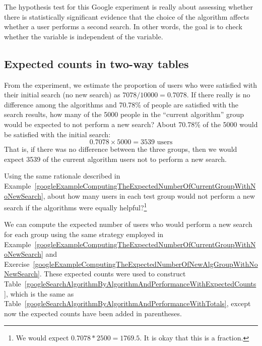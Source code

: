 The hypothesis test for this Google experiment is really about assessing whether there is statistically significant evidence that the choice of the algorithm affects whether a user performs a second search. In other words, the goal is to check whether the  variable is independent of the  variable.


\subsection{Expected counts in two-way tables}

\begin{example}{From the experiment, we estimate the proportion of users who were satisfied with their initial search (no new search) as $7078/10000 = 0.7078$. If there really is no difference among the algorithms and 70.78\% of people are satisfied with the search results, how many of the 5000 people in the ``current algorithm'' group would be expected to not perform a new search?} \label{googleExampleComputingTheExpectedNumberOfCurrentGroupWithNoNewSearch}
About 70.78\% of the 5000 would be satisfied with the initial search:
$$ 0.7078\times 5000 = 3539\text{ users} $$
That is, if there was no difference between the three groups, then we would expect 3539 of the current algorithm users not to perform a new search.
\end{example}

\begin{exercise}\label{googleExampleComputingTheExpectedNumberOfNewAlgGroupWithNoNewSearch}
Using the same rationale described in Example~\ref{googleExampleComputingTheExpectedNumberOfCurrentGroupWithNoNewSearch}, about how many users in each test group would not perform a new search if the algorithms were equally helpful?\footnote{We would expect $0.7078*2500 = 1769.5$. It is okay that this is a fraction.}
\end{exercise}

We can compute the expected number of users who would perform a new search for each group using the same strategy employed in Example~\ref{googleExampleComputingTheExpectedNumberOfCurrentGroupWithNoNewSearch} and Exercise~\ref{googleExampleComputingTheExpectedNumberOfNewAlgGroupWithNoNewSearch}. These expected counts were used to construct Table~\ref{googleSearchAlgorithmByAlgorithmAndPerformanceWithExpectedCounts}, which is the same as Table~\ref{googleSearchAlgorithmByAlgorithmAndPerformanceWithTotals}, except now the expected counts have been added in parentheses.

